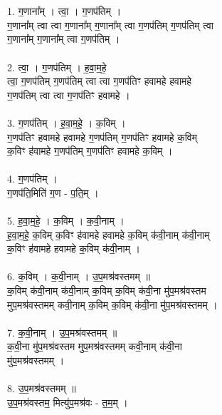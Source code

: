 \section{}
\subsection{}
1. ग॒णाना᳚म् । त्वा॒ । ग॒णप॑तिम् ।\\
ग॒णाना᳚म् त्वा त्वा ग॒णाना᳚म् ग॒णाना᳚म् त्वा ग॒णप॑तिम् ग॒णप॑तिम् त्वा\\
ग॒णाना᳚म् ग॒णाना᳚म् त्वा ग॒णप॑तिम् ।\\
\\
2. त्वा॒ । ग॒णप॑तिम् । ह॒वा॒म॒हे॒ \\
त्वा॒ ग॒णप॑तिम् ग॒णप॑तिम् त्वा त्वा ग॒णप॑तिꣳ हवामहे हवामहे\\
ग॒णप॑तिम् त्वा त्वा ग॒णप॑तिꣳ हवामहे ।\\
\\
3. ग॒णप॑तिम् । ह॒वा॒म॒हे॒ । क॒विम् ।\\
ग॒णप॑तिꣳ हवामहे हवामहे ग॒णप॑तिम् ग॒णप॑तिꣳ हवामहे क॒विम्\\
क॒विꣳ ह॑वामहे ग॒णप॑तिम् ग॒णप॑तिꣳ हवामहे क॒विम् ।\\
\\
4. ग॒णप॑तिम् ।\\
ग॒णप॑ति॒मिति॑ ग॒ण - प॒ति॒म् ।\\
\\
5. ह॒वा॒म॒हे॒ । क॒विम् । क॒वी॒नाम् ।\\
ह॒वा॒म॒हे॒ क॒विम् क॒विꣳ ह॑वामहे हवामहे क॒विम् क॑वी॒नाम् क॑वी॒नाम्\\
क॒विꣳ ह॑वामहे हवामहे क॒विम् क॑वी॒नाम् ।\\
\\
6. क॒विम् । क॒वी॒नाम् । उ॒प॒मश्र॑वस्तमम् ॥\\
क॒विम् क॑वी॒नाम् क॑वी॒नाम् क॒विम् क॒विम् क॑वी॒ना मु॑प॒मश्र॑वस्तम\\
मुप॒मश्र॑वस्तमम् कवी॒नाम् क॒विम् क॒विम् क॑वी॒ना मु॑प॒मश्र॑वस्तमम् ।\\
\\
7. क॒वी॒नाम् । उ॒प॒मश्र॑वस्तमम् ॥\\
क॒वी॒ना मु॑प॒मश्र॑वस्तम मुप॒मश्र॑वस्तमम् कवी॒नाम् क॑वी॒ना\\
मु॑प॒मश्र॑वस्तमम् ।\\
\\
8. उ॒प॒मश्र॑वस्तमम् ॥\\
उ॒प॒मश्र॑वस्तम॒ मित्यु॑प॒मश्र॑वः - त॒म॒म् ।\\
\\
